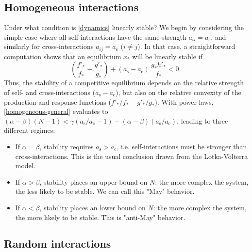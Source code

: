 \documentclass[%
 reprint,
 amsmath,amssymb,
 aps,
]{revtex4-2}
\begin{document}
\subsection{Homogeneous interactions}

Under what condition is \eqref{dynamics} linearly stable? 
We begin by considering the simple case where all self-interactions have the same strength $a_{ii} = a_{\textrm{s}}$, and similarly for cross-interactions $a_{ij} = a_{\textrm{c}}$ ($i\neq j$). 
In that case, a straightforward computation shows that an equilibrium $x_*$ will be linearly stable if  
\begin{equation}\label{homogeneous-general}
    \left(\frac{f'_*}{f_*} - \frac{g'_*}{g_*}\right) + (a_{\textrm{s}} - a_{\textrm{c}})\,\frac{g_*h'_*}{f_*} < 0 \, . 
\end{equation}
Thus, the stability of a competitive equilibrium depends on the relative strength of self- and cross-interactions ($a_{\textrm{s}} - a_{\textrm{c}}$), but also on the relative convexity of the production and response functions ($f'_*/f_* - g'_*/g_*$). 
With power laws, \eqref{homogeneous-general} evaluates to $(\alpha - \beta)(N-1) < \gamma(a_{\textrm{s}}/a_{\textrm{c}}- 1) - (\alpha - \beta)(a_{\textrm{s}}/a_{\textrm{c}})$, leading to three different regimes:
\begin{itemize}
    \item If $\alpha = \beta$, stability requires $a_{\textrm{s}} > a_{\textrm{c}}$, i.e. self-interactions must be stronger than cross-interactions. This is the usual conclusion drawn from the Lotka-Volterra model. 
    \item If $\alpha > \beta$, stability places an upper bound on $N$: the more complex the system, the less likely to be stable. 
    We can call this "May" behavior.
    \item If $\alpha < \beta$, stability places an lower bound on $N$: the more complex the system, the more likely to be stable. This is "anti-May" behavior.
\end{itemize}

\subsection{Random interactions}
\end{document}
